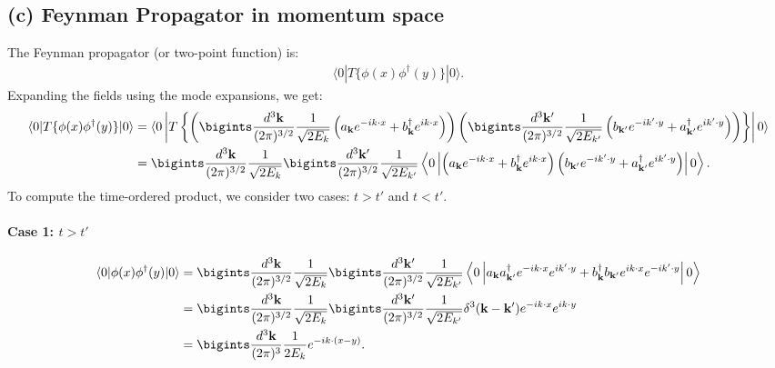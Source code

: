 {\subsection*{(c) Feynman Propagator in momentum space}
The Feynman propagator (or two-point function) is:
\begin{align}
    \langle 0 | T\{\phi(x) \phi^\dagger(y)\} | 0 \rangle.
\end{align}
Expanding the fields using the mode expansions, we get:
\begin{align*}
    \langle 0 | T\{\phi(x) \phi^\dagger(y)\} | 0 \rangle &= \langle 0 \left| T \left\{ \left( \bigints\frac{d^3\mathbf{k}}{(2\pi)^{3/2}} \frac{1}{\sqrt{2E_k}} \left( a_{\mathbf{k}} e^{-ik \cdot x} + b^\dagger_{\mathbf{k}} e^{ik \cdot x} \right) \right) \left( \bigints\frac{d^3\mathbf{k}'}{(2\pi)^{3/2}} \frac{1}{\sqrt{2E_{k'}}} \left( b_{\mathbf{k}'} e^{-ik' \cdot y} + a^\dagger_{\mathbf{k}'} e^{ik' \cdot y} \right) \right) \right\} \right| 0 \rangle \\
    &= \bigints\frac{d^3\mathbf{k}}{(2\pi)^{3/2}} \frac{1}{\sqrt{2E_k}} \bigints\frac{d^3\mathbf{k}'}{(2\pi)^{3/2}} \frac{1}{\sqrt{2E_{k'}}} \left\langle 0 \left| \left(a_{\mathbf{k}} e^{-ik \cdot x} + b^\dagger_{\mathbf{k}} e^{ik \cdot x} \right) \left(b_{\mathbf{k}'} e^{-ik' \cdot y} + a^\dagger_{\mathbf{k}'} e^{ik' \cdot y} \right) \right| 0 \right\rangle.
\end{align*}
To compute the time-ordered product, we consider two cases: \( t > t' \) and \( t < t' \).
\paragraph{Case 1: \( t > t' \)}
\begin{align*}
    \langle 0 | \phi(x) \phi^\dagger(y) | 0 \rangle 
    &= \bigints\frac{d^3\mathbf{k}}{(2\pi)^{3/2}} \frac{1}{\sqrt{2E_k}} \bigints\frac{d^3\mathbf{k}'}{(2\pi)^{3/2}} \frac{1}{\sqrt{2E_{k'}}} \left\langle 0 \left| a_{\mathbf{k}} a^\dagger_{\mathbf{k}'} e^{-ik \cdot x} e^{ik' \cdot y} + b^\dagger_{\mathbf{k}} b_{\mathbf{k}'} e^{ik \cdot x} e^{-ik' \cdot y} \right| 0 \right\rangle \\
    &= \bigints\frac{d^3\mathbf{k}}{(2\pi)^{3/2}} \frac{1}{\sqrt{2E_k}} \bigints\frac{d^3\mathbf{k}'}{(2\pi)^{3/2}} \frac{1}{\sqrt{2E_{k'}}} \delta^3(\mathbf{k} - \mathbf{k'}) e^{-ik \cdot x} e^{ik \cdot y} \\
    &= \bigints\frac{d^3\mathbf{k}}{(2\pi)^{3}} \frac{1}{2E_k} e^{-ik \cdot (x - y)}.
\end{align*}

}
